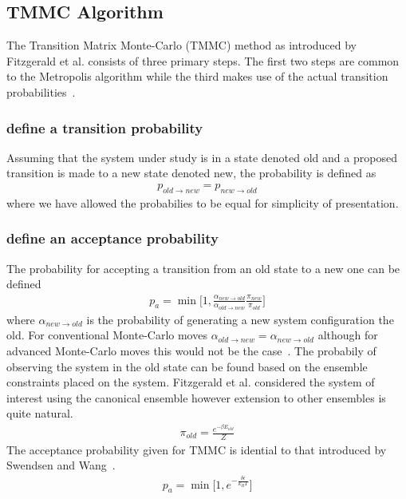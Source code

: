 \documentclass[letterpaper,twocolumn,amsmath,amssymb,pre,aps,10pt]{revtex4-1}
\begin{document}
\subsection{TMMC Algorithm}
The Transition Matrix Monte-Carlo (TMMC) method as introduced by Fitzgerald et al.
consists of three primary steps.  The first two steps are common to the Metropolis
algorithm while the third makes use of the actual transition
probabilities~\cite{fitzgerald2000monte}.

\subsubsection{define a transition probability}
Assuming that the system under study is in a state denoted old and a proposed transition
is made to a new state denoted new, the probability is defined as
\begin{align}
  p_{old \rightarrow new} = p_{new \rightarrow old}
\end{align}
where we have allowed the probabilies to be equal for simplicity of presentation.

\subsubsection{define an acceptance probability}
The probability for accepting a transition from an old state to a new one can be
defined
\begin{align}
  p_{a} = \min\bigg[1,\frac{\alpha_{new\rightarrow old}}
  {\alpha_{old \rightarrow new}}\frac{\pi_{new}}{\pi_{old}}\bigg]
\end{align}
where $\alpha_{new\rightarrow old}$ is the probability of generating a
new system configuration the old.  For conventional Monte-Carlo moves
$\alpha_{old \rightarrow new} =\alpha_{new\rightarrow old}$ although
for advanced Monte-Carlo moves this would not be the
case~\cite{paluch2008comparing, siepmann1990method}.  The probabily of
observing the system in the old state can be found based on the
ensemble constraints placed on the system.  Fitzgerald et al.
considered the system of interest using the canonical ensemble however extension to other ensembles is quite natural.
\begin{align}
  \pi_{old} = \frac{e^{-\beta E_{old}}}{Z}
\end{align}
The acceptance probability given for TMMC is idential to that introduced by
Swendsen and Wang~\cite{wang2002transition}.
\begin{align}
  p_{a} = \min\bigg[1,e^{-\frac{\delta\epsilon}{k_{B} T}}\bigg]
\end{align}
\end{document}
